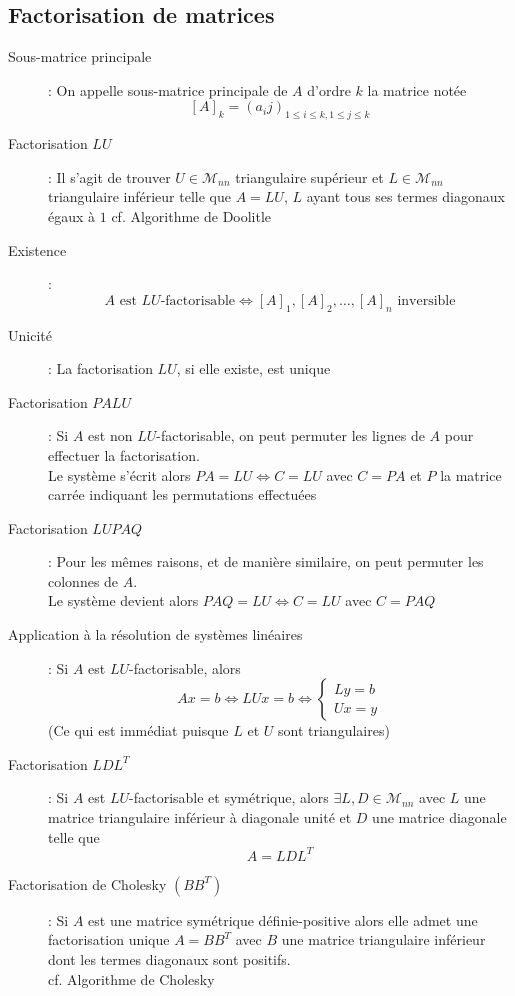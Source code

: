 \subsection{Factorisation de matrices}
\begin{description}
\item[Sous-matrice principale] : On appelle sous-matrice principale de $A$ d'ordre $k$ la matrice notée
    \[
        [A]_k=(a_ij)_{1\le i\le k, 1\le j\le k}
    \]
\item[Factorisation $LU$] : Il s'agit de trouver $U\in\mathcal M_{nn}$ triangulaire supérieur et $L\in\mathcal M_{nn}$ triangulaire inférieur telle que $A=LU$, $L$ ayant tous ses termes diagonaux égaux à $1$
    cf. Algorithme de Doolitle
\item[Existence] :
    \[
        A\textrm{ est } LU\textrm{-factorisable}\Leftrightarrow [A]_1,[A]_2,\dots,[A]_n\textrm{ inversible}
    \]
\item[Unicité] : La factorisation $LU$, si elle existe, est unique
\item[Factorisation $PALU$] : Si $A$ est non $LU$-factorisable, on peut permuter les lignes de $A$ pour effectuer la factorisation.\\
    Le système s'écrit alors $PA=LU\Leftrightarrow C=LU$ avec $C=PA$ et $P$ la matrice carrée indiquant les permutations effectuées
\item[Factorisation $LUPAQ$] : Pour les mêmes raisons, et de manière similaire, on peut permuter les colonnes de $A$.\\
    Le système devient alors $PAQ=LU\Leftrightarrow C=LU$ avec $C=PAQ$
\item[Application à la résolution de systèmes linéaires] : Si $A$ est $LU$-factorisable, alors 
    \[
        Ax=b\Leftrightarrow LUx=b\Leftrightarrow
        \begin{cases}
            Ly=b\\
            Ux=y
        \end{cases}
    \]
    (Ce qui est immédiat puisque $L$ et $U$ sont triangulaires)
\item[Factorisation $LDL^T$] : Si $A$ est $LU$-factorisable et symétrique, alors $\exists L,D\in\mathcal M_{nn}$ avec $L$ une matrice triangulaire inférieur à diagonale unité et $D$ une matrice diagonale telle que 
    \[ A=LDL^T \]
\item[Factorisation de Cholesky $(BB^T)$] : Si $A$ est une matrice symétrique définie-positive alors elle admet une factorisation unique $A=BB^T$ avec $B$ une matrice triangulaire inférieur dont les termes diagonaux sont positifs.\\
    cf. Algorithme de Cholesky
\end{description}